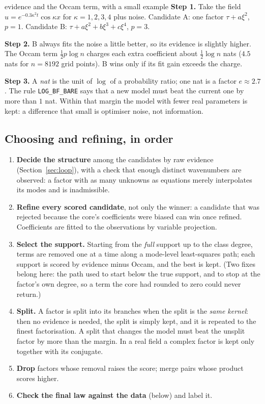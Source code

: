 \documentclass[11pt,a4paper]{article}
\theoremstyle{definition}
\begin{document}
\begin{explained}{evidence and the Occam term, with a small example}
\textbf{Step 1.} Take the field $u=e^{-0.3\kappa^2t}\cos\kappa x$ for $\kappa=1,2,3,4$ plus noise. Candidate A: one factor $\tau+a\xi^2$, $p=1$. Candidate B: $\tau+a\xi^2+b\xi^3+c\xi^4$, $p=3$.

\medskip\textbf{Step 2.} B always fits the noise a little better, so its evidence is slightly higher. The Occam term $\tfrac12p\log n$ charges each extra coefficient about $\tfrac12\log n$ nats ($4.5$ nats for $n=8192$ grid points). B wins only if its fit gain exceeds the charge.

\medskip\textbf{Step 3.} A \emph{nat} is the unit of $\log$ of a probability ratio; one nat is a factor $e\approx2.7$. The rule \texttt{LOG\_BF\_BARE} says that a new model must beat the current one by more than $1$ nat. Within that margin the model with fewer real parameters is kept: a difference that small is optimiser noise, not information.
\end{explained}

\subsection{Choosing and refining, in order}
\begin{enumerate}[nosep]
\item \textbf{Decide the structure} among the candidates by raw evidence (Section~\ref{sec:loop}), with a check that enough distinct wavenumbers are observed: a factor with as many unknowns as equations merely interpolates its modes and is inadmissible.
\item \textbf{Refine every scored candidate}, not only the winner: a candidate that was rejected because the core's coefficients were biased can win once refined. Coefficients are fitted to the observations by variable projection.
\item \textbf{Select the support.} Starting from the \emph{full} support up to the class degree, terms are removed one at a time along a mode-level least-squares path; each support is scored by evidence minus Occam, and the best is kept. (Two fixes belong here: the path used to start below the true support, and to stop at the factor's own degree, so a term the core had rounded to zero could never return.)
\item \textbf{Split.} A factor is split into its branches when the split is the \emph{same kernel}: then no evidence is needed, the split is simply kept, and it is repeated to the finest factorisation. A split that changes the model must beat the unsplit factor by more than the margin. In a real field a complex factor is kept only together with its conjugate.
\item \textbf{Drop} factors whose removal raises the score; merge pairs whose product scores higher.
\item \textbf{Check the final law against the data} (below) and label it.
\end{enumerate}
\end{document}
